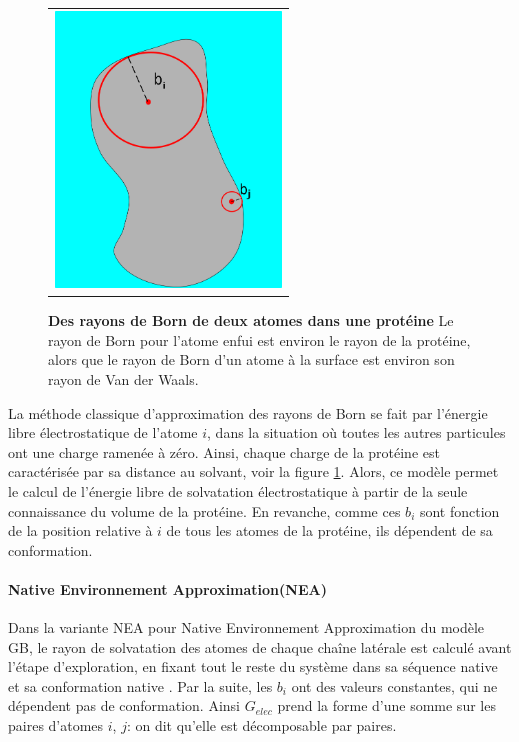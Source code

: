    \begin{figure}[!htbp]
     \centering
     \begin{tabular}{c}
       \includegraphics[width=6cm]{figure/rayon_Born.png} &
     \end{tabular}
     
     \caption{\textbf{Des rayons de Born de deux atomes dans une protéine} Le rayon de Born pour l'atome enfui est environ le rayon de la protéine, alors que le rayon de Born d'un atome à la surface est environ son rayon de Van der Waals.} 
\label{graph:rayonBorn}
   \end{figure}


La méthode classique d'approximation des rayons de Born se fait par l'énergie libre électrostatique de l'atome $i$, dans la situation où toutes les autres particules ont une charge ramenée à zéro. Ainsi, chaque charge de la protéine est caractérisée par sa distance au solvant, voir la figure \ref{graph:rayonBorn}. Alors, ce modèle permet le calcul de l'énergie libre de solvatation électrostatique à partir de la seule connaissance du volume de la protéine. En revanche, comme ces $b_i$ sont fonction de la position relative à $i$ de tous les atomes de la protéine, ils dépendent de sa conformation.
\paragraph{\og Native Environnement Approximation\fg (NEA)}
\label{NEA}
Dans la variante NEA pour \og Native Environnement Approximation \fg  du modèle GB, le rayon de solvatation des atomes de chaque chaîne latérale est calculé avant l'étape d'exploration, en fixant tout le reste du système dans sa séquence native et sa conformation native \cite{Polydorides11,Simonson13,Gaillard14}. Par la suite, les $b_i$ ont des valeurs constantes, qui ne dépendent pas de conformation. Ainsi $G_{elec}$ prend la forme d'une somme sur les paires d'atomes $i$, $j$: on dit qu'elle est \og décomposable par paires\fg.


